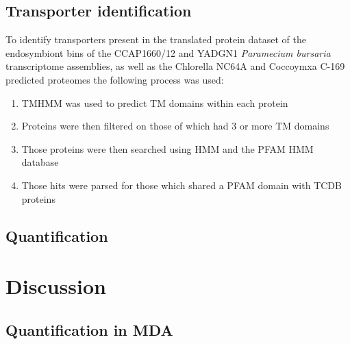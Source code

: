 \subsection{Transporter identification}

To identify transporters present in the translated protein dataset of the 
endosymbiont bins of the CCAP1660/12 and YADGN1 
\textit{Paramecium bursaria} transcriptome assemblies, as well as the Chlorella NC64A 
and Coccoymxa C-169 predicted proteomes the following process was used:

\begin{enumerate}
        \item TMHMM was used to predict TM domains within each protein
        \item Proteins were then filtered on those of which had 3 or more TM domains
        \item Those proteins were then searched using HMM and the PFAM HMM database
        \item Those hits were parsed for those which shared a PFAM domain with TCDB proteins
\end{enumerate}

\subsection{Quantification}



\section{Discussion}

\subsection{Quantification in MDA}
\\





